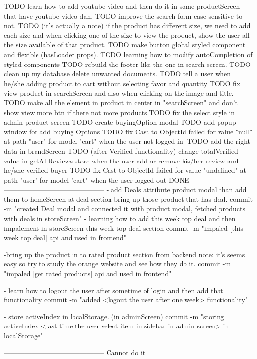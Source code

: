 
TODO   learn how to add youtube video and then do it in some 
      productScreen that have youtube video dah.
TODO   improve the search form case sensitive to not.
TODO   (it's actually a note) if the product has different size, 
      we need to add each size and when
      clicking one of the size to view the product, show the 
      user all the size available of that product.
TODO   make button global styled component and flexible 
      (hasLoader props).
TODO   learning how to modify autoCompletion of styled components 
TODO   rebuild the footer like the one in search screen.
TODO   clean up my database delete unwanted documents.
TODO   tell a user when he/she adding product to cart without selecting favor and quantity
TODO   fix view product in searchScreen and also when clicking on the image and title.
TODO   make all the element in product in center in "searchScreen" and don't show view more btn if there not more products
TODO   fix the select style in admin product screen
TODO   create buyingOption modal 
TODO   add popup window for add buying Options
TODO   fix Cast to ObjectId failed for value "null" at path "user" for model "cart" when the user not logged in.
TODO   add the right data in brandScreen 
TODO   (after Verified functionality) change totalVerified value in getAllReviews store when the user add or remove his/her review and he/she verified buyer
TODO fix Cast to ObjectId failed for value "undefined" at path 
      "user" for model "cart" when the user logged out
DONE
--------------------------------------------
- add Deals attribute product modal than add them to homeScreen 
       at deal section bring up those product that has deal.
       commit -m "created Deal modal and connected it with product modal, fetched products with deals in 
       storeScreen"
- learning how to add this week top deal and then impalement in storeScreen this week top deal section
      commit -m "impaled [this week top deal] api and used in frontend"

-bring up the product in to rated product section from backend 
      note: it's seems easy so try to study the orange website and see how they do it.
      commit -m "impaled [get rated products] api and used in frontend"

-   learn how to logout the user after sometime of login and 
            then add that functionality
      commit -m "added <logout the user after one week> functionality"

- store activeIndex in localStorage. (in adminScreen)
      commit -m "storing activeIndex <last time the user select item in sidebar in admin screen> in localStorage"

--------------------------------------------
Cannot do it
